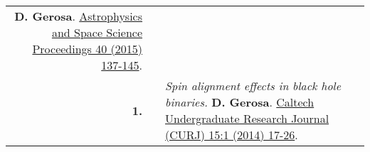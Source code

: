 {\begin{longtable}{rp{0.3cm}p{15.8cm}}
\newline{}
\textbf{D. Gerosa}.
\newline{}
\href{http://dx.doi.org/10.1007/978-3-319-10488-1_12}{Astrophysics and Space Science Proceedings 40 (2015) 137-145}. 
\vspace{0.09cm}\\
%
\textbf{1.} & & \textit{Spin alignment effects in black hole binaries.}
\newline{}
\textbf{D. Gerosa}.
\newline{}
\href{https://caltechcampuspubs.library.caltech.edu/2800/}{Caltech Undergraduate Research Journal (CURJ) 15:1 (2014) 17-26}. 
\vspace{0.09cm}\\
%
\end{longtable} }